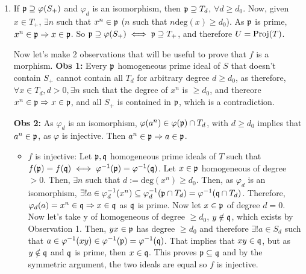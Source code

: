 \begin{sol}
\begin{enumerate}[label=\alph*)]
		\item If $\mathfrak{p} \supseteq \varphi(S_+)$ and $\varphi_d$ is an isomorphism, then $\mathfrak{p} \supseteq T_d$, $\forall d \geq d_0$. Now, given $x \in T_+$, $\exists n$ such that $x^n \in \mathfrak{p}$ ($n$ such that $n \mathrm{deg}(x) \geq d_0$). As $\mathfrak{p}$ is prime, $x^n \in \mathfrak{p} \Rightarrow x \in \mathfrak{p}$. So $\mathfrak{p} \supseteq \varphi(S_+) \iff \mathfrak{p} \supseteq T_+$, and therefore $U = \mathrm{Proj}(T)$.

		Now let's make 2 observations that will be useful to prove that $f$ is a morphism. 
		\textbf{Obs 1:} Every $\mathfrak{p}$ homogeneous prime ideal of $S$ that doesn't contain $S_+$ cannot contain all $T_d$ for arbitrary degree $d \geq d_0$, as therefore, $\forall x \in T_d, d > 0, \exists n$ such that the degree of $x^n$ is $\geq d_0$, and thereore $x^n \in \mathfrak{p} \Rightarrow x \in \mathfrak{p}$, and all $S_+$ is contained in $\mathfrak{p}$, which is a contradiction.

		\textbf{Obs 2:} As $\varphi_d$ is an isomorphism, $\varphi(a^n) \in \varphi(\mathfrak{p}) \cap T_d$, with $d \geq d_0$ implies that $a^n \in \mathfrak{p}$, as $\varphi$ is injective. Then $a^n \in \mathfrak{p} \Rightarrow a \in \mathfrak{p}$. 

		\begin{itemize}
			\item $f$ is injective: Let $\mathfrak{p}, \mathfrak{q}$ homogeneous prime ideals of $T$ such that $f(\mathfrak{p}) = f(\mathfrak{q}) \iff \varphi^{-1}(\mathfrak{p}) = \varphi^{-1}(\mathfrak{q})$. Let $x \in \mathfrak{p}$ homogeneous of degree $> 0$. Then, $\exists n$ such that $d:= \mathrm{deg}(x^n) \geq d_0$. Then, as $\varphi_d$ is an isomorphism, $\exists! a \in \varphi_d^{-1}(x^n) \subseteq \varphi_d^{-1}(\mathfrak{p} \cap T_d) = \varphi^{-1}(\mathfrak{q} \cap T_d)$. Therefore, $\varphi_d(a) = x^n \in \mathfrak{q} \Rightarrow x \in \mathfrak{q}$ as $\mathfrak{q}$ is prime. Now let $x \in \mathfrak{p}$ of degree $d = 0$. Now let's take y of homogeneous of degree $\geq d_0$, $y \notin \mathfrak{q}$, which exists by Observation 1. Then, $yx \in \mathfrak{p}$ has degree $\geq d_0$ and therefore $\exists! a \in S_d$ such that $a \in \varphi^{-1}(xy) \in \varphi^{-1}(\mathfrak{p}) = \varphi^{-1}(\mathfrak{q})$. That implies that $xy \in \mathfrak{q}$, but as $y \notin \mathfrak{q}$ and $\mathfrak{q}$ is prime, then $x \in \mathfrak{q}$. This proves $\mathfrak{p} \subseteq \mathfrak{q}$ and by the symmetric argument, the two ideals are equal so $f$ is injective.


\end{itemize}
\end{enumerate}
\end{sol}
